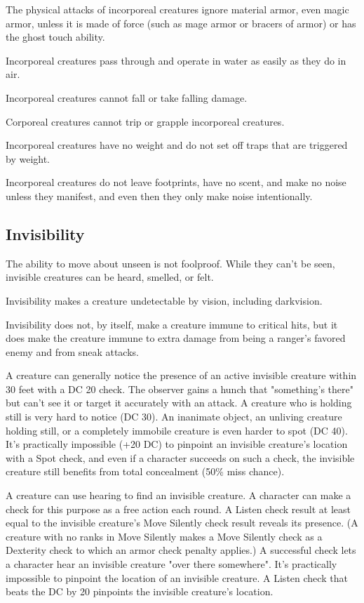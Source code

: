 The physical attacks of incorporeal creatures ignore material armor, even magic 
armor, unless it is made of force (such as mage armor or bracers of armor) or has 
the ghost touch ability. 

Incorporeal creatures pass through and operate in water as easily as they do in 
air.

Incorporeal creatures cannot fall or take falling damage.

Corporeal creatures cannot trip or grapple incorporeal creatures. 

Incorporeal creatures have no weight and do not set off traps that are triggered 
by weight.

Incorporeal creatures do not leave footprints, have no scent, and make no noise 
unless they manifest, and even then they only make noise intentionally.

\subsection{Invisibility}

The ability to move about unseen is not foolproof. While they can't be seen, invisible 
creatures can be heard, smelled, or felt. 

Invisibility makes a creature undetectable by vision, including darkvision.

Invisibility does not, by itself, make a creature immune to critical hits, but 
it does make the creature immune to extra damage from being a ranger's favored 
enemy and from sneak attacks.

A creature can generally notice the presence of an active invisible creature within 
30 feet with a DC 20  check. The observer gains a hunch that "something's 
there" but can't see it or target it accurately with an attack. A creature who 
is holding still is very hard to notice (DC 30). An inanimate object, an unliving 
creature holding still, or a completely immobile creature is even harder to spot 
(DC 40). It's practically impossible (+20 DC) to pinpoint an invisible creature's 
location with a Spot check, and even if a character succeeds on such a check, the 
invisible creature still benefits from total concealment (50\% miss chance).

A creature can use hearing to find an invisible creature. A character can make 
a  check for this purpose as a free action each round. A Listen check result 
at least equal to the invisible creature's Move Silently check result reveals its 
presence. (A creature with no ranks in Move Silently makes a Move Silently check 
as a Dexterity check to which an armor check penalty applies.) A successful check 
lets a character hear an invisible creature "over there somewhere". It's practically 
impossible to pinpoint the location of an invisible creature. A Listen check that 
beats the DC by 20 pinpoints the invisible creature's location.

